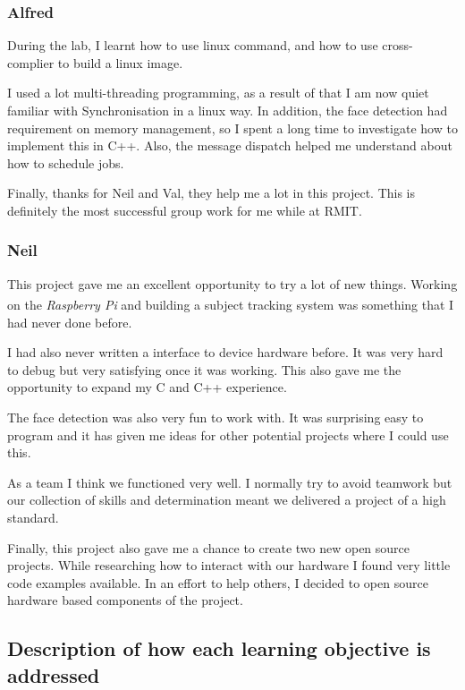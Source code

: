 \documentclass[11pt,a4paper,titlepage]{report}
\newcommand{\rpi}{\textit{Raspberry Pi\textsuperscript{\textregistered}}}
\begin{document}
\subsubsection{Alfred}

During the lab, I learnt how to use linux command, and how to use cross-complier to build a linux image.

I used a lot multi-threading programming, as a result of that I am now quiet familiar with Synchronisation in a linux way. In addition, the face detection had requirement on memory management, so I spent a long time to investigate how to implement this in C++. Also, the message dispatch helped me understand about how to schedule jobs.

Finally, thanks for Neil and Val, they help me a lot in this project. This is definitely the most successful group work for me while at RMIT.


\subsubsection{Neil}

This project gave me an excellent opportunity to try a lot of new things. Working on the \rpi\xspace and building a subject tracking system was something that I had never done before.


I had also never written a interface to device hardware before. It was very hard to debug but very satisfying once it was working. This also gave me the opportunity to expand my C and C++ experience.

The face detection was also very fun to work with. It was surprising easy to program and it has given me ideas for other potential projects where I could use this.


As a team I think we functioned very well. I normally try to avoid teamwork but our collection of skills and determination meant we delivered a project of a high standard.


Finally, this project also gave me a chance to create two new open source projects. While researching how to interact with our hardware I found very little code examples available. In an effort to help others, I decided to open source hardware based components of the project.


\subsection{Description of how each learning objective is addressed}
\end{document}
